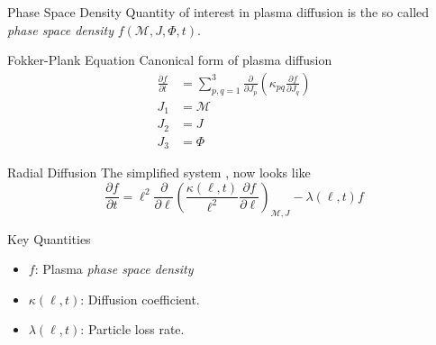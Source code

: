 \documentclass{beamer}
\begin{document}
\begin{frame}{Phase Space Density}
  Quantity of interest in plasma diffusion is the so called
  \emph{phase space density} $f(\mathcal{M}, J, \Phi, t)$.
\end{frame}

\begin{frame}{Fokker-Plank Equation}
  Canonical form of plasma diffusion \cite{Schulz1974} 
  \begin{align*}
    \frac{\partial{f}}{\partial{t}} &= \sum^{3}_{p,q = 1}
    \frac{\partial}{\partial{J_{p}}} \left( \kappa_{pq}
    \frac{\partial{f}}{\partial{J_{q}}} \right) \\
    J_1 &= \mathcal{M} \\
    J_2 &= J \\
    J_{3} &= \Phi
  \end{align*}
\end{frame}



\begin{frame}{Radial Diffusion}
  The simplified system \cite{Walt1970}, now looks like
  \begin{equation*}
    \frac{\partial{f}}{\partial{t}} = \ell^2 \frac{\partial}{\partial{\ell}} \left( \frac{\kappa(\ell,
        t)}{\ell^{2}} \frac{\partial{f}}{\partial{\ell}}
    \right)_{\mathcal{M}, J} - \lambda(\ell,
    t) f
  \end{equation*}
\end{frame}

\begin{frame}{Key Quantities}
  \begin{itemize}
  \item {
      $f$: Plasma \emph{phase space density}
    \pause %
  }
  \item {   
      $\kappa(\ell, t)$: Diffusion coefficient.
  }
  \item<3-> {
    $\lambda(\ell, t)$: Particle loss rate.
  }
  \end{itemize}
\end{frame}
\end{document}
